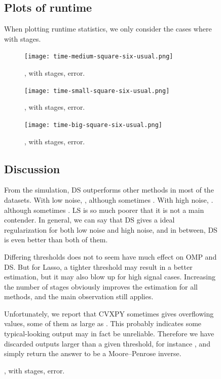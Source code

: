 \begin {figure} [H]
\subsection {Plots of runtime}

When plotting runtime statistics, we only consider the cases where  with  stages.
%
\begin {figure} [H]
\texttt{[image: time-medium-square-six-usual.png]}
\caption {, with  stages, error.}
\end {figure}
%
\begin {figure} [H]
\texttt{[image: time-small-square-six-usual.png]}
\caption {, with  stages, error.}
\end {figure}
%
\begin {figure} [H]
\texttt{[image: time-big-square-six-usual.png]}
\caption {, with  stages, error.}
\end {figure}

\stopsubsection

\subsection {Discussion}

From the simulation, DS outperforms other methods in most of the datasets.
With low noise, ,
although sometimes .
With high noise, .
although sometimes .
LS is so much poorer that it is not a main contender.
In general, we can say that DS gives a ideal regularization for both low noise and high noise, and in between, DS is even better than both of them.

Differing thresholds does not to seem have much effect on OMP and DS.
But for Lasso, a tighter threshold may result in a better estimation, but it may also blow up for high signal cases.
Increasing the number of stages obviously improves the estimation for all methods, and the main observation still applies.

Unfortunately, we report that CVXPY sometimes gives overflowing values, some of them as large as .
This probably indicates some typical-looking output may in fact be unreliable.
Therefore we have discarded outputs larger than a given threshold, for instance , and simply return the answer to be a Moore–Penrose inverse.


\end{figure}
